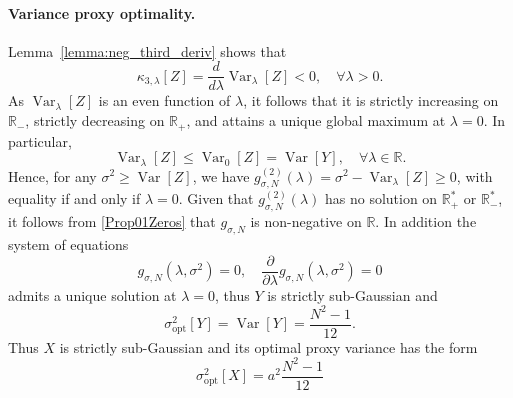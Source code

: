 \documentclass[a4paper, 10pt]{article}
\newcommand{\beq}{\begin{equation}}
\newcommand{\eeq}{\end{equation}}
\theoremstyle{definition}
\begin{document}
\paragraph{Variance proxy optimality.}
Lemma~\ref{lemma:neg_third_deriv} shows that
\[
\kappa_{3,\lambda}[Z] = \frac{d}{d\lambda}\operatorname{Var}_{\lambda}[Z] < 0, \quad \forall \lambda > 0.
\]
As \( \operatorname{Var}_{\lambda}[Z] \) is an even function of \( \lambda \), it follows that it is strictly increasing on \( \mathbb{R}_- \), strictly decreasing on \( \mathbb{R}_+ \), and attains a unique global maximum at \( \lambda = 0 \). In particular,
\[
\operatorname{Var}_{\lambda}[Z] \leq \operatorname{Var}_0[Z] = \operatorname{Var}[Y], \quad \forall \lambda \in \mathbb{R}.
\]
    Hence, for any \( \sigma^2 \geq \operatorname{Var}[Z] \), we have \( g_{\sigma,N}^{(2)}(\lambda) = \sigma^2 - \operatorname{Var}_\lambda[Z] \geq 0 \), with equality if and only if \( \lambda = 0 \). Given that \( g_{\sigma,N}^{(2)}(\lambda)\) has no solution on $\mathbb{R^*_+} \text{ or } \mathbb{R^*_-}$, it follows from \autoref{Prop01Zeros} that $g_{\sigma,N}$ is non-negative on $\mathbb{R} $. In addition the system of equations
\[
g_{\sigma,N}(\lambda,\sigma^2) = 0, \quad \frac{\partial}{\partial \lambda} g_{\sigma,N}(\lambda,\sigma^2) = 0
\]
admits a unique solution at \( \lambda = 0 \), thus \( Y \) is strictly sub-Gaussian and \beq 
\sigma^2_{\mathrm{opt}}[Y] = \operatorname{Var}[Y] = \frac{N^2 - 1}{12}. \eeq Thus \(X\) is strictly sub-Gaussian and its optimal proxy variance has the form \beq \sigma^2_{\mathrm{opt}}[X] = a^2 \frac{N^2 - 1}{12} \eeq

 
\end{document}
